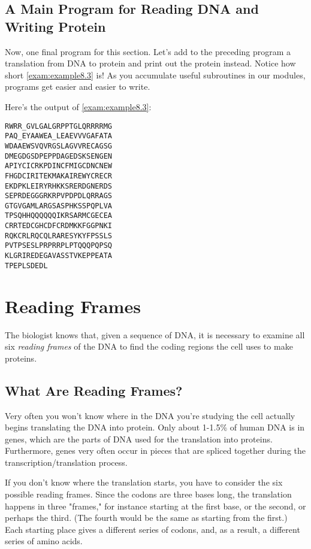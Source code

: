 \subsection{A Main Program for Reading DNA and Writing Protein}
Now, one final program for this section. Let's add to the preceding program a translation from DNA to protein and print out the protein instead. Notice how short \autoref{exam:example8.3} is! As you accumulate useful subroutines in our modules, programs get easier and easier to write. 



Here's the output of \autoref{exam:example8.3}:

\begin{lstlisting}
RWRR_GVLGALGRPPTGLQRRRRMG
PAQ_EYAAWEA_LEAEVVVGAFATA
WDAAEWSVQVRGSLAGVVRECAGSG
DMEGDGSDPEPPDAGEDSKSENGEN
APIYCICRKPDINCFMIGCDNCNEW
FHGDCIRITEKMAKAIREWYCRECR
EKDPKLEIRYRHKKSRERDGNERDS
SEPRDEGGGRKRPVPDPDLQRRAGS
GTGVGAMLARGSASPHKSSPQPLVA
TPSQHHQQQQQQIKRSARMCGECEA
CRRTEDCGHCDFCRDMKKFGGPNKI
RQKCRLRQCQLRARESYKYFPSSLS
PVTPSESLPRPRRPLPTQQQPQPSQ
KLGRIREDEGAVASSTVKEPPEATA
TPEPLSDEDL
\end{lstlisting}

\section{Reading Frames}
The biologist knows that, given a sequence of DNA, it is necessary to examine all six \textit{reading frames} of the DNA to find the coding regions the cell uses to make proteins. 

\subsection{What Are Reading Frames?}
Very often you won't know where in the DNA you're studying the cell actually begins translating the DNA into protein. Only about 1-1.5\% of human DNA is in genes, which are the parts of DNA used for the translation into proteins. Furthermore, genes very often occur in pieces that are spliced together during the transcription/translation process.

If you don't know where the translation starts, you have to consider the six possible reading frames. Since the codons are three bases long, the translation happens in three "frames," for instance starting at the first base, or the second, or perhaps the third. (The fourth would be the same as starting from the first.) Each starting place gives a different series of codons, and, as a result, a different series of amino acids.

